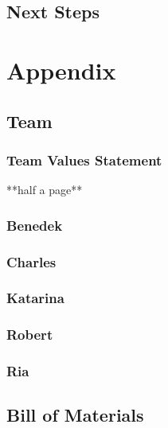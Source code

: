 \documentclass[11pt]{article}
\begin{document}
\begin{multicols*}{2}
        \subsection{Next Steps}


    \newpage

    
    

    \newpage

    \section{Appendix}
        \subsection{Team}
            \subsubsection{Team Values Statement}
                **half a page**

            \subsubsection{Benedek}

            \subsubsection{Charles}

            \subsubsection{Katarina}

            \subsubsection{Robert}

            \subsubsection{Ria}

            
        \subsection{Bill of Materials}


\end{multicols*}
\end{document}

